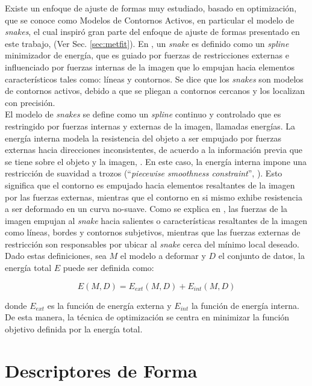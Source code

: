 Existe un enfoque de ajuste de formas muy estudiado, basado en optimizaci\'on,
que se conoce como Modelos de Contornos Activos, en particular el modelo de \emph{snakes}, 
el cual inspir\'o gran parte del enfoque de ajuste de formas presentado en este trabajo, (Ver
Sec. \ref{sec:metfit}). En \cite{snakes}, un \emph{snake} es definido como
un \emph{spline} minimizador de energ\'ia, que es guiado por fuerzas de restricciones
externas e influenciado por fuerzas internas de la imagen que lo empujan
hacia elementos caracter\'isticos tales como: l\'ineas y contornos.
Se dice que los \emph{snakes} son modelos de contornos activos, debido a que
se pliegan a contornos cercanos y los localizan con precisi\'on.\\
El modelo de \emph{snakes} se define como un \emph{spline} continuo y controlado que 
es restringido por fuerzas internas y externas de la imagen, llamadas energ\'ias.
La energ\'ia interna modela la resistencia del objeto a ser empujado por fuerzas externas
hacia direcciones inconsistentes, de acuerdo a la informaci\'on previa que se tiene sobre 
el objeto y la imagen, \cite{deformable}. En este caso, la energ\'ia interna impone una
restricci\'on de suavidad a trozos (``\emph{piecewise smoothness constraint}'', \cite{snakes}).
Esto significa que el contorno es empujado hacia elementos resaltantes de la imagen por las
fuerzas externas, mientras que el contorno en si mismo exhibe resistencia a ser deformado
en un curva no-suave. Como se explica en \cite{deformable}, las fuerzas de la imagen
empujan al \emph{snake} hacia salientes o caracter\'isticas resaltantes de la imagen como l\'ineas,
bordes y contornos subjetivos, mientras que las fuerzas externas de restricci\'on son responsables
por ubicar al \emph{snake} cerca del m\'inimo local deseado.\\

Dado estas definiciones, sea $M$ el modelo a deformar y $D$ el conjunto de datos, 
la energ\'ia total $E$ puede ser definida como:

$$E(M,D) = E_{ext}(M,D) + E_{int}(M,D)$$

donde $E_{ext}$ es la funci\'on de energ\'ia externa y $E_{int}$ la funci\'on
de energ\'ia interna. De esta manera, la t\'ecnica de optimizaci\'on se centra
en minimizar la funci\'on objetivo definida por la energ\'ia total.

\section{Descriptores de Forma}
\label{sec:shapedesc}

